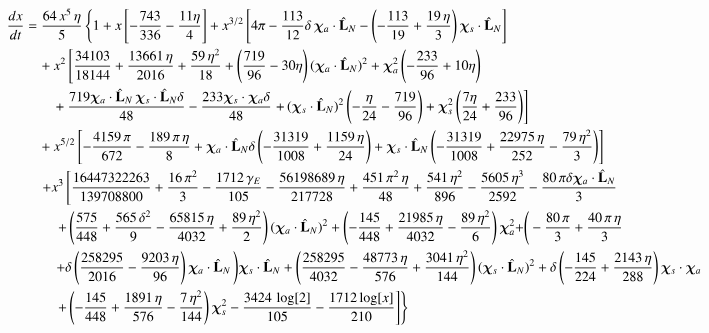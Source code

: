 \documentclass[prd,preprintnumbers,twocolumn,eqsecnum,floatfix,letter]{revtex4}
\begin{document}
\begin{widetext}
\begin{align}\label{eq:FbydE}
\frac{dx}{dt}&= \frac{64\, x^5  \, \eta}{5} \left\{1 + x \left[-\frac{743}{336}-\frac{11 \eta }{4} \right] 
+ x^{3/2} \left[4 \pi-\frac{113}{12}\delta \, \bm{\chi}_a \cdot \hat{\mathbf{L}}_N- \left(-\frac{113}{19} + \frac{19 \, \eta}{3}  \right)\bm{\chi}_s \cdot \hat{\mathbf{L}}_N \right] \right. \nonumber \\ 
&\quad + x^2 \left[ \frac{34103}{18144} + \frac{13661 \, \eta}{2016} + \frac{59 \, \eta^2}{18} + \left( \frac{719}{96}- 30 \eta\right)(\bm{\chi}_a \cdot \hat{\mathbf{L}}_N)^2 +\bm{\chi}_a^2 \left(-\frac{233}{96}+10 \eta \right) \right. \nonumber\\
&\qquad+\frac{719 \bm{\chi}_a \cdot \hat{\mathbf{L}}_N \, \bm{\chi}_s \cdot \hat{\mathbf{L}}_N \delta}{48}-\frac{233 \bm{\chi}_s \cdot \bm{\chi}_a \delta}{48} \left. + \, (\bm{\chi}_s \cdot \hat{\mathbf{L}}_N)^2 \left(-\frac{\eta }{24}-\frac{719}{96}\right)+\bm{\chi}_s^2 \left(\frac{7 \eta
}{24}+\frac{233}{96}\right) \right] \nonumber \\ 
&\quad + x^{5/2} \left[-\frac{4159 \, \pi}{672}-\frac{189 \, \pi \, \eta}{8} + \bm{\chi}_a \cdot \hat{\mathbf{L}}_N \delta  \left(-\frac{31319}{1008} + \frac{1159 \, \eta}{24}\right)+\bm{\chi}_s \cdot \hat{\mathbf{L}}_N \left(-\frac{31319}{1008} + \frac{22975 \, \eta}{252} -\frac{79 \, \eta^2}{3}\right) \right]  \nonumber\\ 
&\quad \left. + x^3 \left[\frac{16447322263}{139708800} + \frac{16 \, \pi^2}{3} -\frac{1712 \, \gamma_{E}}{105} -\frac{56198689 \, \eta}{217728} + \frac{451 \, \pi^2 \, \eta}{48} + \frac{541 \, \eta^2}{896} -\frac{5605 \, \eta^{3}}{2592} -\frac{80 \,\pi \delta\bm{\chi}_a \cdot \hat{\mathbf{L}}_N }{3} \right.\right. \nonumber \\
&\qquad \left.\left. + \left(\frac{575}{448} + \frac{565 \, \delta^2}{9}-\frac{65815 \, \eta}{4032} + \frac{89 \, \eta^2}{2}\right)(\bm{\chi}_a \cdot \hat{\mathbf{L}}_N)^2 + \left(-\frac{145}{448}+\frac{21985 \,\eta}{4032} -\frac{89 \, \eta^2}{6}\right)\bm{\chi}_a^2 + \right(-\frac{80 \, \pi}{3} + \frac{40 \, \pi \, \eta}{3} \right. \nonumber \\
&\qquad  \left.+\delta\left(\frac{258295}{2016} -\frac{9203 \, \eta}{96}\right)\bm{\chi}_a \cdot \hat{\mathbf{L}}_N\left)\bm{\chi}_s \cdot \hat{\mathbf{L}}_N + \left(\frac{258295}{4032} -\frac{48773 \, \eta}{576} + \frac{3041 \, \eta^2}{144}\right)(\bm{\chi}_s \cdot \hat{\mathbf{L}}_N)^2 + \delta\left(-\frac{145}{224} + \frac{2143 \, \eta}{288}\right)\bm{\chi}_s \cdot \bm{\chi}_a \right.\right.\nonumber \\ 
&\qquad\left.\left.+\left(-\frac{145}{448} + \frac{1891 \, \eta}{576} -\frac{7 \, \eta^2}{144}\right)\bm{\chi}_s^2 - \frac{3424 \, \log[2]}{105} - \frac{1712 \log[x]}{210}\right]\right\}
\end{align}


\end{widetext}
\end{document}
